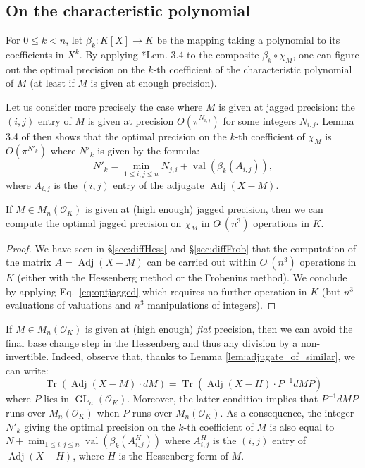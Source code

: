 \documentclass{sig-alternate-05-2015}
\DeclareMathOperator{\GL}{GL}
\DeclareMathOperator{\val}{val}
\DeclareMathOperator{\tr}{Tr}
\DeclareMathOperator{\adj}{Adj}
\newcommand{\OK}{\mathcal{O}_K}
\newcommand{\softO}{O\tilde{~}}
\begin{document}
\subsection{On the characteristic polynomial}

For $0 \leq k < n$, let $\beta_k : K[X] \to K$ be the mapping taking a 
polynomial to its coefficients in $X^k$. By applying 
\cite{caruso-roe-vaccon:14a}*{Lem. 3.4} to the composite $\beta_k 
\circ \chi_M$, one can figure out the optimal precision on the
$k$-th coefficient of the characteristic polynomial of $M$ (at
least if $M$ is given at enough precision).

Let us consider more precisely the case where $M$ is given at 
jagged precision: the $(i,j)$ entry of $M$ is given at precision 
$O(\pi^{N_{i,j}})$ for some integers $N_{i,j}$. 
Lemma 3.4 of \cite{caruso-roe-vaccon:14a} then shows that
the optimal precision on the $k$-th coefficient of $\chi_M$ is 
$O(\pi^{N'_k})$ where $N'_k$ is given by the formula:
\begin{equation}
\label{eq:optjagged}
N'_k = \min_{1 \leq i, j\leq n} N_{j,i} + \val(\beta_k(A_{i,j})),
\end{equation}
where $A_{i,j}$ is the $(i,j)$ entry of the adjugate $\adj(X{-}M)$.

\begin{prop} \label{prop:optimal_jagged}
If $M \in M_n(\OK)$ is given at (high enough) jagged precision, 
then we can compute the optimal jagged precision on $\chi_M$ in 
$\softO (n^3)$ operations in $K$.
\end{prop}

\begin{proof}
We have seen in \S \ref{sec:diffHess} and \S \ref{sec:diffFrob}
that the computation of the matrix $A = \adj(X{-}M)$ can be carried out 
within $\softO(n^3)$ operations in $K$ (either with the Hessenberg 
method or the Frobenius method). We conclude by applying 
Eq.~\eqref{eq:optjagged} which requires no further operation in $K$
(but $n^3$ evaluations of valuations and $n^3$ manipulations of 
integers).
\end{proof}

\begin{rem}
If $M \in M_n(\OK)$ is given at (high enough) \emph{flat} precision, 
then we can avoid the final base change step in the Hessenberg 
and thus any division by a non-invertible.
Indeed, observe that, thanks to Lemma \ref{lem:adjugate_of_similar}, 
we can write:
$$\tr(\adj (X{-}M) \cdot dM)=\tr(\adj (X{-}H)\cdot P^{-1} dM P)$$
where $P$ lies in $\GL_n(\OK)$. Moreover, the latter condition implies
that $P^{-1} dM P$ runs over $M_n(\OK)$ when $P$ runs over $M_n(\OK)$.
As a consequence, the integer $N'_k$ giving the optimal precision on the 
$k$-th coefficient of $M$ is also equal to
$N + \min_{1 \leq i, j\leq n} \val(\beta_k(A^H_{i,j}))$
where $A^H_{i,j}$ is the $(i,j)$ entry of $\adj(X{-}H)$,
where $H$ is the Hessenberg form of $M$.
\end{rem}
\end{document}
